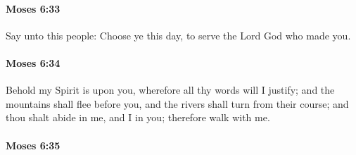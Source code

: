 
		\paragraph{Moses 6:33} %
			\label{MOSES-6-33}

			Say unto this people: Choose ye this day, to serve the Lord God who made you.


		\paragraph{Moses 6:34} %
			\label{MOSES-6-34}

			Behold my Spirit is upon you, wherefore all thy words will I justify; and the mountains shall flee before you, and the rivers shall turn from their course; and thou shalt abide in me, and I in you; therefore walk with me.


		\paragraph{Moses 6:35} %
			\label{MOSES-6-35}

